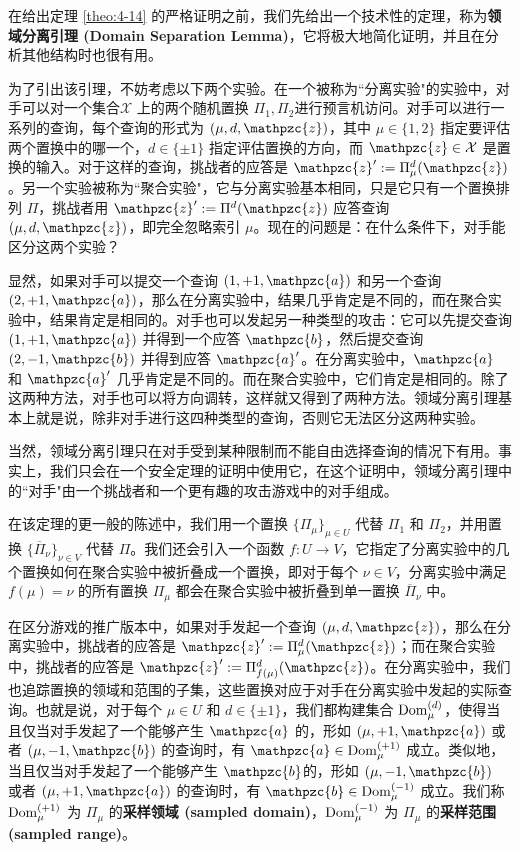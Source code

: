 在给出定理 \ref{theo:4-14} 的严格证明之前，我们先给出一个技术性的定理，称为\textbf{领域分离引理 (Domain Separation Lemma)}，它将极大地简化证明，并且在分析其他结构时也很有用。

为了引出该引理，不妨考虑以下两个实验。在一个被称为``分离实验"的实验中，对手可以对一个集合$\mathcal{X}$ 上的两个随机置换 $\Pi_1,\Pi_2$进行预言机访问。对手可以进行一系列的查询，每个查询的形式为 $(\mu,d,\mathpzc{z})$，其中 $\mu\in\{1,2\}$ 指定要评估两个置换中的哪一个，$d\in\{\pm1\}$ 指定评估置换的方向，而 $\mathpzc{z}\in\mathcal{X}$ 是置换的输入。对于这样的查询，挑战者的应答是 $\mathpzc{z}':=\Pi_\mu^d(\mathpzc{z})$。另一个实验被称为``聚合实验"，它与分离实验基本相同，只是它只有一个置换排列 $\Pi$，挑战者用 $\mathpzc{z}':=\Pi^d(\mathpzc{z})$ 应答查询 $(\mu,d,\mathpzc{z})$，即完全忽略索引 $\mu$。现在的问题是：在什么条件下，对手能区分这两个实验？

显然，如果对手可以提交一个查询 $(1,+1,\mathpzc{a})$ 和另一个查询 $(2,+1,\mathpzc{a})$，那么在分离实验中，结果几乎肯定是不同的，而在聚合实验中，结果肯定是相同的。对手也可以发起另一种类型的攻击：它可以先提交查询 $(1,+1,\mathpzc{a})$ 并得到一个应答 $\mathpzc{b}$，然后提交查询 $(2,-1,\mathpzc{b})$ 并得到应答 $\mathpzc{a}'$。在分离实验中，$\mathpzc{a}$ 和 $\mathpzc{a}'$ 几乎肯定是不同的。而在聚合实验中，它们肯定是相同的。除了这两种方法，对手也可以将方向调转，这样就又得到了两种方法。领域分离引理基本上就是说，除非对手进行这四种类型的查询，否则它无法区分这两种实验。

当然，领域分离引理只在对手受到某种限制而不能自由选择查询的情况下有用。事实上，我们只会在一个安全定理的证明中使用它，在这个证明中，领域分离引理中的``对手"由一个挑战者和一个更有趣的攻击游戏中的对手组成。

在该定理的更一般的陈述中，我们用一个置换 $\{\Pi_\mu\}_{\mu\in U}$ 代替 $\Pi_1$ 和 $\Pi_2$，并用置换 $\{\overline\Pi_\nu\}_{\nu\in V}$ 代替 $\Pi$。我们还会引入一个函数 $f:U\to V$，它指定了分离实验中的几个置换如何在聚合实验中被折叠成一个置换，即对于每个 $\nu\in V$，分离实验中满足 $f(\mu)=\nu$ 的所有置换 $\Pi_\mu$ 都会在聚合实验中被折叠到单一置换 $\overline\Pi_\nu$ 中。

在区分游戏的推广版本中，如果对手发起一个查询 $(\mu,d,\mathpzc{z})$，那么在分离实验中，挑战者的应答是 $\mathpzc{z}':=\Pi_\mu^d(\mathpzc{z})$；而在聚合实验中，挑战者的应答是 $\mathpzc{z}':=\Pi^d_{f(\mu)}(\mathpzc{z})$。在分离实验中，我们也追踪置换的领域和范围的子集，这些置换对应于对手在分离实验中发起的实际查询。也就是说，对于每个 $\mu\in U$ 和 $d\in\{\pm1\}$，我们都构建集合 ${\rm Dom}^{(d)}_\mu$，使得当且仅当对手发起了一个能够产生 $\mathpzc{a}$ 的，形如 $(\mu,+1,\mathpzc{a})$ 或者 $(\mu,-1,\mathpzc{b})$ 的查询时，有 $\mathpzc{a}\in{\rm Dom}^{(+1)}_\mu$ 成立。类似地，当且仅当对手发起了一个能够产生 $\mathpzc{b}$的，形如 $(\mu,-1,\mathpzc{b})$ 或者 $(\mu,+1,\mathpzc{a})$ 的查询时，有 $\mathpzc{b}\in{\rm Dom}^{(-1)}_\mu$ 成立。我们称 ${\rm Dom}^{(+1)}_\mu$ 为 $\Pi_\mu$ 的\textbf{采样领域 (sampled domain)}，${\rm Dom}^{(-1)}_\mu$ 为 $\Pi_\mu$ 的\textbf{采样范围 (sampled range)}。

